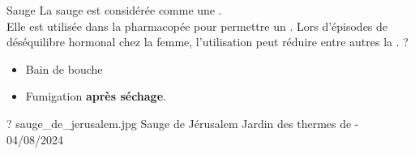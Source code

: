 \ficheidentiteplante
{Sauge}
{%
    La sauge est considérée comme une .\\ 
    Elle est utilisée dans la pharmacopée pour permettre un .
}
{%
    Lors d'épisodes de déséquilibre hormonal chez la femme, l'utilisation peut réduire entre autres la . 
}
{%
    ?
}
{%
    \begin{itemize}[label = \bcplume]
        \item Bain de bouche
        \item Fumigation \textbf{après séchage}.
    \end{itemize}
}
{%
    ?
}
{%
    sauge_de_jerusalem.jpg
}
{%
    Sauge de Jérusalem
}
{%
    Jardin des thermes de  - 04/08/2024 
}
